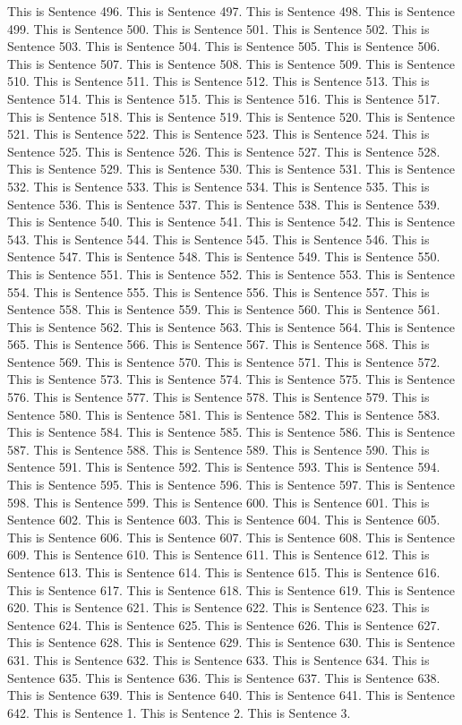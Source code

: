 \documentclass{article}
\begin{document}
This is Sentence 496.
This is Sentence 497.
This is Sentence 498.
This is Sentence 499.
This is Sentence 500.
This is Sentence 501.
This is Sentence 502.
This is Sentence 503.
This is Sentence 504.
This is Sentence 505.
This is Sentence 506.
This is Sentence 507.
This is Sentence 508.
This is Sentence 509.
This is Sentence 510.
This is Sentence 511.
This is Sentence 512.
This is Sentence 513.
This is Sentence 514.
This is Sentence 515.
This is Sentence 516.
This is Sentence 517.
This is Sentence 518.
This is Sentence 519.
This is Sentence 520.
This is Sentence 521.
This is Sentence 522.
This is Sentence 523.
This is Sentence 524.
This is Sentence 525.
This is Sentence 526.
This is Sentence 527.
This is Sentence 528.
This is Sentence 529.
This is Sentence 530.
This is Sentence 531.
This is Sentence 532.
This is Sentence 533.
This is Sentence 534.
This is Sentence 535.
This is Sentence 536.
This is Sentence 537.
This is Sentence 538.
This is Sentence 539.
This is Sentence 540.
This is Sentence 541.
This is Sentence 542.
This is Sentence 543.
This is Sentence 544.
This is Sentence 545.
This is Sentence 546.
This is Sentence 547.
This is Sentence 548.
This is Sentence 549.
This is Sentence 550.
This is Sentence 551.
This is Sentence 552.
This is Sentence 553.
This is Sentence 554.
This is Sentence 555.
This is Sentence 556.
This is Sentence 557.
This is Sentence 558.
This is Sentence 559.
This is Sentence 560.
This is Sentence 561.
This is Sentence 562.
This is Sentence 563.
This is Sentence 564.
This is Sentence 565.
This is Sentence 566.
This is Sentence 567.
This is Sentence 568.
This is Sentence 569.
This is Sentence 570.
This is Sentence 571.
This is Sentence 572.
This is Sentence 573.
This is Sentence 574.
This is Sentence 575.
This is Sentence 576.
This is Sentence 577.
This is Sentence 578.
This is Sentence 579.
This is Sentence 580.
This is Sentence 581.
This is Sentence 582.
This is Sentence 583.
This is Sentence 584.
This is Sentence 585.
This is Sentence 586.
This is Sentence 587.
This is Sentence 588.
This is Sentence 589.
This is Sentence 590.
This is Sentence 591.
This is Sentence 592.
This is Sentence 593.
This is Sentence 594.
This is Sentence 595.
This is Sentence 596.
This is Sentence 597.
This is Sentence 598.
This is Sentence 599.
This is Sentence 600.
This is Sentence 601.
This is Sentence 602.
This is Sentence 603.
This is Sentence 604.
This is Sentence 605.
This is Sentence 606.
This is Sentence 607.
This is Sentence 608.
This is Sentence 609.
This is Sentence 610.
This is Sentence 611.
This is Sentence 612.
This is Sentence 613.
This is Sentence 614.
This is Sentence 615.
This is Sentence 616.
This is Sentence 617.
This is Sentence 618.
This is Sentence 619.
This is Sentence 620.
This is Sentence 621.
This is Sentence 622.
This is Sentence 623.
This is Sentence 624.
This is Sentence 625.
This is Sentence 626.
This is Sentence 627.
This is Sentence 628.
This is Sentence 629.
This is Sentence 630.
This is Sentence 631.
This is Sentence 632.
This is Sentence 633.
This is Sentence 634.
This is Sentence 635.
This is Sentence 636.
This is Sentence 637.
This is Sentence 638.
This is Sentence 639.
This is Sentence 640.
This is Sentence 641.
This is Sentence 642.
This is Sentence 1.
This is Sentence 2.
This is Sentence 3.
\end{document}
